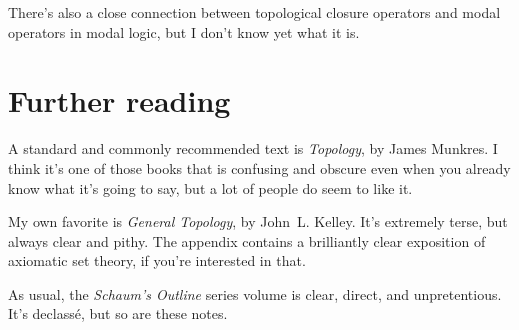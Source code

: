 \documentclass{article}
\begin{document}
There's also a close connection between topological closure operators
and modal operators in modal logic, but I don't know yet what it is.

\section*{Further reading}

A standard and commonly recommended text is {\em Topology\/}, by James
Munkres.  I think it's one of those books that is confusing and
obscure even when you already know what it's going to say, but a lot
of people do seem to like it.

My own favorite is {\em General Topology\/}, by John~L. Kelley.  It's
extremely terse, but always clear and pithy.  The appendix contains a
brilliantly clear exposition of axiomatic set theory, if you're
interested in that.

As usual, the {\em Schaum's Outline\/} series volume is clear, direct,
and unpretentious.  It's declass\'e, but so are these notes.
\end{document}
